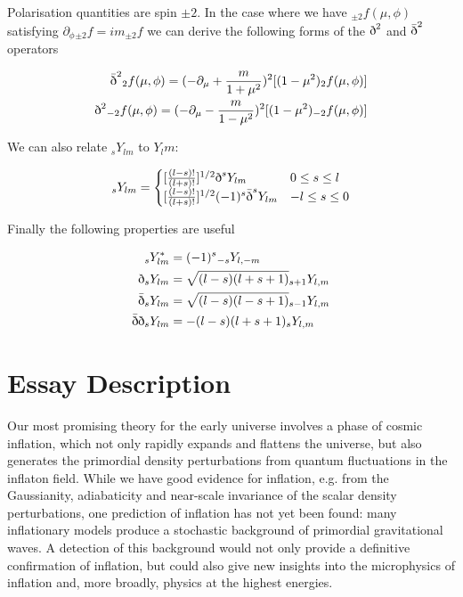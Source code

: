 \documentclass[a4paper,11pt]{article}
\newcommand{\sr}{\text{\normalfont\dh}}
\renewcommand{\sl}{\bar{\text{\normalfont\dh}}}
\begin{document}
Polarisation quantities are spin $\pm 2$. In the case where we have ${}_{\pm2}f(\mu,\phi)$ satisfying $\partial_\phi{}_{\pm2}f=im_{\pm2}f$ we can derive the following forms of the $\sr^2$ and $\sl^2$ operators

\begin{align}
\sl^2{}_2f(\mu, \phi) = (-\partial_\mu+\frac{m}{1+\mu^2})^2[(1-\mu^2)_2f(\mu,\phi)]\\
\sr^2{}_{-2}f(\mu, \phi) = (-\partial_\mu-\frac{m}{1-\mu^2})^2[(1-\mu^2)_{-2}f(\mu,\phi)]
\label{+-2}
\end{align}


We can also relate $_sY_{lm}$ to $Y_lm$:

\begin{equation}
_sY_{lm} = 
\begin{cases}
[\frac{(l-s)!}{(l+s)!}]^{1/2}\sr^s Y_{lm} & 0\leq s\leq l\\
[\frac{(l-s)!}{(l+s)!}]^{1/2}(-1)^s\sl^s Y_{lm} & -l\leq s\leq 0
\end{cases}
\end{equation}


Finally the following properties are useful

\begin{align}
{}_sY_{lm}^* &= (-1)^s {}_{-s}Y_{l,-m}\\
\sr {}_sY_{lm} &= \sqrt{(l-s)(l+s+1)}{}_{s+1}Y_{l,m}\\
\sl {}_sY_{lm} &= \sqrt{(l-s)(l-s+1)}{}_{s-1}Y_{l,m}\\
\sl\sr {}_sY_{lm} &= -(l-s)(l+s+1){}_{s}Y_{l,m}
\label{propertiesofspin}
\end{align}

\section{Essay Description}
Our most promising theory for the early universe involves a phase of cosmic inflation, which not only rapidly expands and flattens the universe, but also generates the primordial density perturbations from quantum fluctuations in the inflaton field. While we have good evidence for inflation, e.g. from the Gaussianity, adiabaticity and near-scale invariance of the scalar density perturbations, one prediction of inflation has not yet been found: many inflationary models produce a stochastic background of primordial gravitational waves. A detection of this background would not only provide a definitive confirmation of inflation, but could also give new insights into the microphysics of inflation and, more broadly, physics at the highest energies.\\
\end{document}

